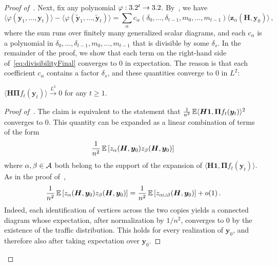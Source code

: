 \begin{proof}[Proof of~]
    Next, fix any polynomial $\varphi:3.2^t\to 3.2$. By~, we have
    \begin{equation}
        \langle \varphi (\bm y_1, \ldots, \bm y_t)\rangle - \langle \varphi(\tilde {\bm y}_1, \ldots, \tilde{\bm y}_t)\rangle = \sum_{\alpha} c_{\alpha}(\delta_0, \ldots, \delta_{t-1},m_0,\ldots,m_{t-1}) \langle \bm z_{\alpha}(\bm H, \bm y_0)\rangle\,,\label{eq:divisibilityFinal}
    \end{equation}
    where the sum runs over finitely many generalized scalar diagrams, and each $c_\alpha$ is a polynomial in $\delta_0,\ldots,\delta_{t-1},m_0,\ldots,m_{t-1}$ that is divisible by some $\delta_s$. 
    In the remainder of the proof, we show that each term on the right-hand side of~\cref{eq:divisibilityFinal} converges to $0$ in expectation.
    The reason is that each coefficient $c_\alpha$ contains a factor $\delta_s$, and these quantities converge to $0$ in $L^2$:
    \begin{claim}\label{lem:correctionNegligible}
        $\langle \bm H \bm \Pi f_t(\bm y_{t})\rangle \overset{L^2}\longrightarrow 0$ for any $t\ge 1$.
    \end{claim}
    
    \begin{proof}[Proof of~]
        The claim is equivalent to the statement that $\frac{1}{n^2}\operatorname*{\mathbb{E}} \langle \bm H \bm 1, \bm \Pi f_t(\bm y_t)\rangle^2$ converges to $0$.
        This quantity can be expanded as a linear combination of terms of the form
        \[\frac{1}{n^2} \operatorname*{\mathbb{E}} \left[z_\alpha (\bm H, \bm y_0) z_\beta (\bm H, \bm y_0)\right]\,
        \]
        where $\alpha,\beta\in{\cal A}$ both belong to the support of the expansion of
        $\langle \bm H \bm 1, \bm \Pi f_t(\bm y_t)\rangle$.
        As in the proof of~,
        \[
            \frac 1 {n^2} \operatorname*{\mathbb{E}} \left[z_\alpha (\bm H, \bm y_0) z_\beta (\bm H, \bm y_0)\right] = \frac 1{n^2} \operatorname*{\mathbb{E}} \left[z_{\alpha\sqcup \beta} (\bm H, \bm y_0)\right]+o(1)\,.
        \]
        Indeed, each identification of vertices across the two copies yields a connected diagram whose expectation, after normalization by $1/n^2$, converges to $0$ by the existence of the traffic distribution. This holds for every realization of $\bm y_0$, and therefore also after taking expectation over $\bm y_0$.
        

\end{proof}
\end{proof}
